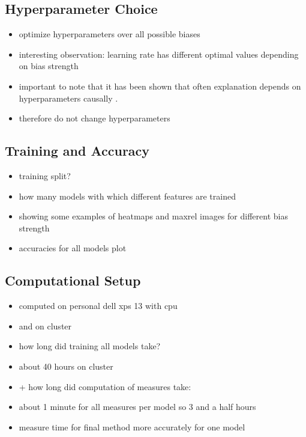\subsection{Hyperparameter Choice}
\begin{itemize}
    \item optimize hyperparameters over all possible biases
    \item interesting observation: learning rate has different optimal values depending on bias strength
    \item important to note that it has been shown that often explanation depends on hyperparameters causally \cite{Karimi2023}.
    \item therefore do not change hyperparameters
\end{itemize}

\subsection{Training and Accuracy}
\begin{itemize}
    \item training split?
    \item how many models with which different features are trained
    \item showing some examples of heatmaps and maxrel images for different bias strength
    \item accuracies for all models plot
\end{itemize}

\subsection{Computational Setup}
\label{section:setup}
\begin{itemize}
    \item computed on personal dell xps 13 with cpu
    \item and on cluster 
    \item how long did training all models take?
    \item about 40 hours on cluster
    \item + how long did computation of measures take: 
    \item about 1 minute for all measures per model so 3 and a half hours
    \item measure time for final method more accurately for one model 
\end{itemize}

